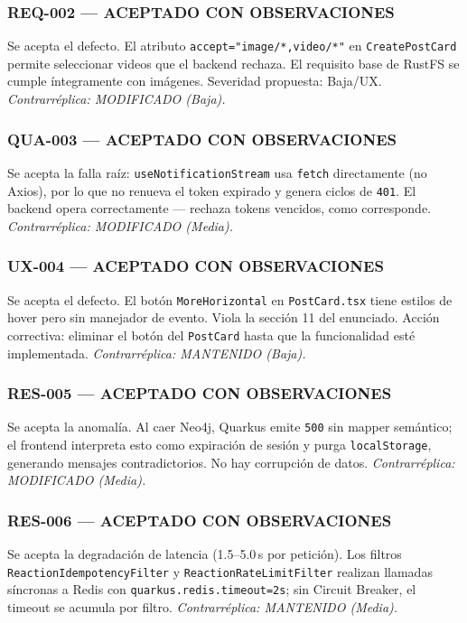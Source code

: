 \documentclass[10pt,a4paper]{article}
\newcommand{\code}[1]{\nolinkurl{#1}}
\begin{document}
\subsubsection*{REQ-002 — ACEPTADO CON OBSERVACIONES}
Se acepta el defecto. El atributo \code{accept="image/*,video/*"} en \code{CreatePostCard} permite seleccionar videos que el backend rechaza. El requisito base de RustFS se cumple íntegramente con imágenes. Severidad propuesta: Baja/UX. \textit{Contrarréplica: MODIFICADO (Baja).}

\subsubsection*{QUA-003 — ACEPTADO CON OBSERVACIONES}
Se acepta la falla raíz: \code{useNotificationStream} usa \code{fetch} directamente (no Axios), por lo que no renueva el token expirado y genera ciclos de \code{401}. El backend opera correctamente — rechaza tokens vencidos, como corresponde. \textit{Contrarréplica: MODIFICADO (Media).}

\subsubsection*{UX-004 — ACEPTADO CON OBSERVACIONES}
Se acepta el defecto. El botón \code{MoreHorizontal} en \code{PostCard.tsx} tiene estilos de hover pero sin manejador de evento. Viola la sección 11 del enunciado. Acción correctiva: eliminar el botón del \code{PostCard} hasta que la funcionalidad esté implementada. \textit{Contrarréplica: MANTENIDO (Baja).}

\subsubsection*{RES-005 — ACEPTADO CON OBSERVACIONES}
Se acepta la anomalía. Al caer Neo4j, Quarkus emite \code{500} sin mapper semántico; el frontend interpreta esto como expiración de sesión y purga \code{localStorage}, generando mensajes contradictorios. No hay corrupción de datos. \textit{Contrarréplica: MODIFICADO (Media).}

\subsubsection*{RES-006 — ACEPTADO CON OBSERVACIONES}
Se acepta la degradación de latencia (1.5--5.0\,s por petición). Los filtros \code{ReactionIdempotencyFilter} y \code{ReactionRateLimitFilter} realizan llamadas síncronas a Redis con \code{quarkus.redis.timeout=2s}; sin Circuit Breaker, el timeout se acumula por filtro. \textit{Contrarréplica: MANTENIDO (Media).}
\end{document}
